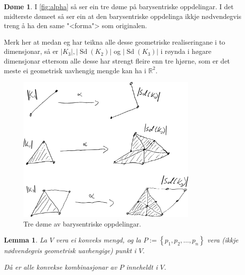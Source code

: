 \documentclass[a4paper, 12pt, norsk]{article}
\theoremstyle{plain}
\newtheorem{lemma}[theorem]{Lemma}
\theoremstyle{definition}
\newtheorem{example}[theorem]{Døme}
\newcommand{\Rb}{\mathbb{R}}
\newcommand{\gr}[1]{ \lvert #1 \rvert } %
\newcommand{\set}[1]{ \left\{ #1 \right\} } %
\DeclareMathOperator{\Sd}{Sd} %
\begin{document}
\begin{example}
	I \autoref{fig:alpha} så ser ein tre døme på barysentriske oppdelingar. I det midterste dømeet så ser ein at den barysentriske oppdelinga ikkje nødvendegvis treng å ha den same "<forma"> som originalen.
	
	Merk her at medan eg har teikna alle desse geometriske realiseringane i to dimensjonar, så er \( \gr{K_3}, \gr{\Sd(K_2)} \) og \( \gr{\Sd(K_3)} \) i røynda i høgare dimensjonar ettersom alle desse har strengt fleire enn tre hjørne, som er det meste ei geometrisk uavhengig mengde kan ha i \( \Rb^2 \).
	\begin{figure}[htbp]
		\begin{center}
			\includegraphics[width=0.8\textwidth]{png/Alpha.png}
		\end{center}
		\caption{Tre døme av barysentriske oppdelingar.}
		\label{fig:alpha}
	\end{figure}
\end{example}

\begin{lemma} \label{thm:konveks-kombinasjon-i-konveks}
	La \( V \) vera ei konveks mengd, og la \( P := \set{p_1, p_2, \dots, p_n } \) vera (ikkje nødvendegvis geometrisk uavhengige) punkt i \( V \).
	
	Då er alle konvekse kombinasjonar av \( P \) inneheldt i \( V \).
\end{lemma}
\end{document}
